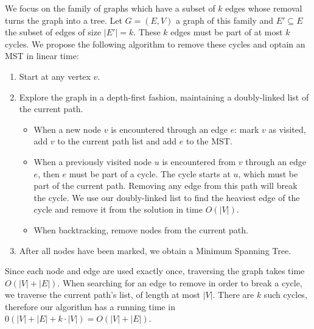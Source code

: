 
We focus on the family of graphs which have a subset of $k$ edges whose removal turns the graph into a tree. Let $G = (E, V)$ a graph of this family and $E' \subseteq E$ the subset of edges of size $|E'| = k$. These $k$ edges must be part of at most $k$ cycles. We propose the following algorithm to remove these cycles and optain an MST in linear time:

\begin{enumerate}
  \item Start at any vertex $v$.
  \item Explore the graph in a depth-first fashion, maintaining a doubly-linked list of the current path.
  \begin{itemize}
    \item When a new node $v$ is encountered through an edge $e$: mark $v$ as visited, add $v$ to the current path list and add $e$ to the MST.
    \item When a previously visited node $u$ is encountered from $v$ through an edge $e$, then $e$ must be part of a cycle. The cycle starts at $u$, which must be part of the current path. Removing any edge from this path will break the cycle. We use our doubly-linked list to find the heaviest edge of the cycle and remove it from the solution in time $O(|V|)$.
    \item When backtracking, remove nodes from the current path.
  \end{itemize}
  \item After all nodes have been marked, we obtain a Minimum Spanning Tree.
\end{enumerate}

\noindent
Since each node and edge are used exactly once, traversing the graph takes time $O(|V| + |E|)$. When searching for an edge to remove in order to break a cycle, we traverse the current path's list, of length at most $|V|$. There are $k$ such cycles, therefore our algorithm has a running time in $0(|V| + |E| + k \cdot |V|) = O(|V| + |E|)$.
